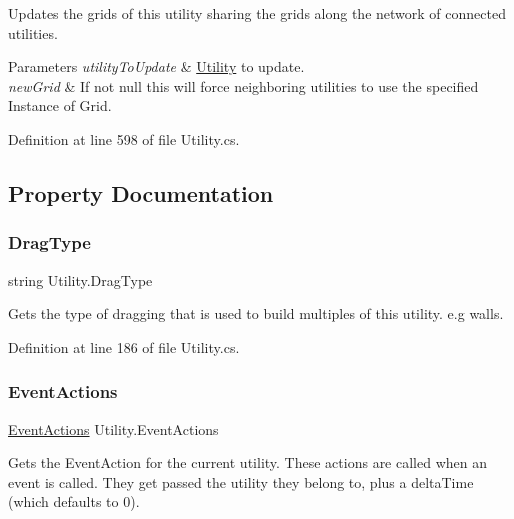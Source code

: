 Updates the grids of this utility sharing the grids along the network of connected utilities. 


\begin{DoxyParams}{Parameters}
{\em utility\+To\+Update} & \hyperlink{class_utility}{Utility} to update.\\
\hline
{\em new\+Grid} & If not null this will force neighboring utilities to use the specified Instance of Grid.\\
\hline
\end{DoxyParams}


Definition at line 598 of file Utility.\+cs.



\subsection{Property Documentation}
\mbox{\label{class_utility_a6594cc21d854b3a0962bf10a12b1306b}} 
\subsubsection{\texorpdfstring{Drag\+Type}{DragType}}
{\footnotesize\ttfamily string Utility.\+Drag\+Type\hspace{0.3cm}{\ttfamily [get]}}



Gets the type of dragging that is used to build multiples of this utility. e.\+g walls. 



Definition at line 186 of file Utility.\+cs.

\mbox{\label{class_utility_a186a1d1f22ab01e15ac65aff6961eb64}} 
\subsubsection{\texorpdfstring{Event\+Actions}{EventActions}}
{\footnotesize\ttfamily \hyperlink{class_event_actions}{Event\+Actions} Utility.\+Event\+Actions\hspace{0.3cm}{\ttfamily [get]}}



Gets the Event\+Action for the current utility. These actions are called when an event is called. They get passed the utility they belong to, plus a delta\+Time (which defaults to 0). 

